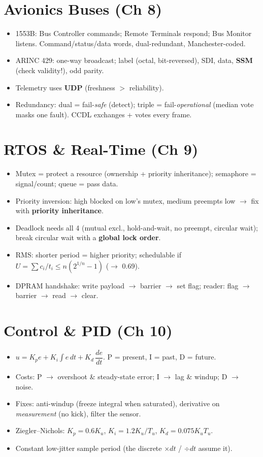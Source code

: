 \section*{Avionics Buses (Ch 8)}
\begin{itemize}
\item 1553B: Bus Controller commands; Remote Terminals respond; Bus Monitor
  listens. Command/status/data words, dual-redundant, Manchester-coded.
\item ARINC 429: one-way broadcast; label (octal, bit-reversed), SDI, data,
  \textbf{SSM} (check validity!), odd parity.
\item Telemetry uses \textbf{UDP} (freshness $>$ reliability).
\item Redundancy: dual = fail-\emph{safe} (detect); triple = fail-\emph{operational}
  (median vote masks one fault). CCDL exchanges + votes every frame.
\end{itemize}

\section*{RTOS \& Real-Time (Ch 9)}
\begin{itemize}
\item Mutex = protect a resource (ownership + priority inheritance); semaphore =
  signal/count; queue = pass data.
\item Priority inversion: high blocked on low's mutex, medium preempts low
  $\rightarrow$ fix with \textbf{priority inheritance}.
\item Deadlock needs all 4 (mutual excl., hold-and-wait, no preempt, circular
  wait); break circular wait with a \textbf{global lock order}.
\item RMS: shorter period = higher priority; schedulable if
  $U=\sum c_i/t_i \le n(2^{1/n}-1)$ ($\rightarrow$ 0.69).
\item DPRAM handshake: write payload $\rightarrow$ barrier $\rightarrow$ set
  flag; reader: flag $\rightarrow$ barrier $\rightarrow$ read $\rightarrow$
  clear.
\end{itemize}

\section*{Control \& PID (Ch 10)}
\begin{itemize}
\item $u = K_p e + K_i\!\int e\,dt + K_d\,\dfrac{de}{dt}$. P = present, I = past,
  D = future.
\item Costs: P $\rightarrow$ overshoot \& steady-state error; I $\rightarrow$
  lag \& windup; D $\rightarrow$ noise.
\item Fixes: anti-windup (freeze integral when saturated), derivative on
  \emph{measurement} (no kick), filter the sensor.
\item Ziegler--Nichols: $K_p=0.6K_u$, $K_i=1.2K_u/T_u$, $K_d=0.075K_uT_u$.
\item Constant low-jitter sample period (the discrete $\times dt$ / $\div dt$
  assume it).
\end{itemize}

